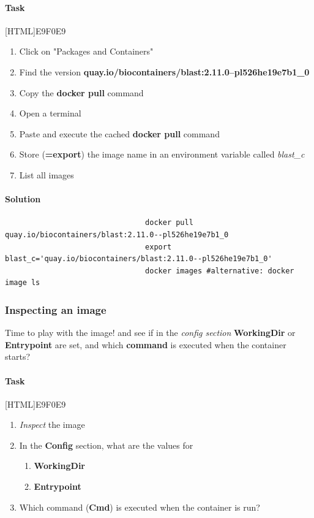 \documentclass[12pt]{article}
\begin{document}
					\paragraph{Task}
						[HTML]{E9F0E9}{\parbox{\linewidth}{%
								\begin{enumerate}
									\item Click on "Packages and Containers"
									\item Find the version \textbf{quay.io/biocontainers/blast:2.11.0--pl526he19e7b1\_0}
									\item Copy the \textbf{docker pull} command
									\item Open a terminal
									\item Paste and execute the cached \textbf{docker pull} command
									\item Store (\textbf{=export}) the image name in an environment variable called \textit{blast\_c}
									\item List all images
								\end{enumerate}
						}}
					
					\paragraph{Solution}	
				
						\begin{minipage}{\linewidth}
							\begin{lstlisting}
								docker pull quay.io/biocontainers/blast:2.11.0--pl526he19e7b1_0
								export blast_c='quay.io/biocontainers/blast:2.11.0--pl526he19e7b1_0'
								docker images #alternative: docker image ls
							\end{lstlisting}
						\end{minipage}
		
			\subsubsection{Inspecting an image}
				Time to play with the image!  and see if in the \textit{config section} \textbf{WorkingDir} or \textbf{Entrypoint} are set, and which \textbf{command} is executed when the container starts?
	
				\paragraph{Task}
					[HTML]{E9F0E9}{\parbox{\linewidth}{%
						\begin{enumerate}
							\item \textit{Inspect} the image
							\item In the \textbf{Config} section, what are the values for 
							 \begin{enumerate}
							 	\item \textbf{WorkingDir}
							 	\item \textbf{Entrypoint}
							\end{enumerate}
								\item Which command (\textbf{Cmd}) is executed when the container is run?
						\end{enumerate}
					}}
					
\end{document}

